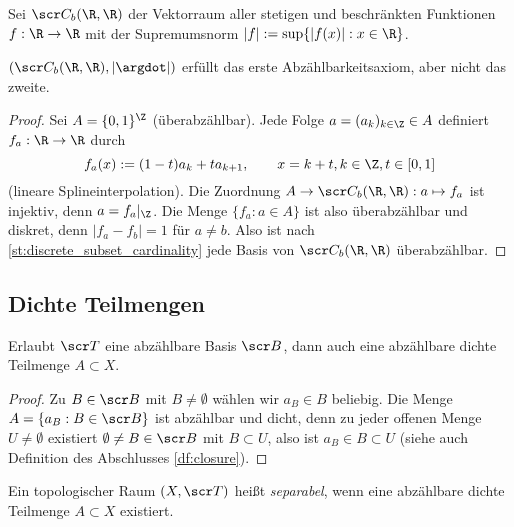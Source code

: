 \begin{st}
	Sei $\scr C_b(\R, \R)$ der Vektorraum aller stetigen und beschränkten Funktionen $f: \R \to \R$ mit der Supremumsnorm $|f| := \sup \{|f(x)| : x \in \R \}$.

	$(\scr C_b(\R,\R),|\argdot|)$ erfüllt das erste Abzählbarkeitsaxiom, aber nicht das zweite.
	\begin{proof}
		Sei $A = \{0, 1\}^\Z$ (überabzählbar).
		Jede Folge $a = (a_k)_{k\in\Z} \in A$ definiert $f_a : \R \to \R$ durch
		\[
			f_a(x)
			:= (1-t)a_k + t a_{k+1},
			\qquad x = k+t, k \in \Z, t \in [0,1]
		\]
		(lineare Splineinterpolation).
		Die Zuordnung $A \to \scr C_b (\R, \R) : a \mapsto f_a$ ist injektiv, denn $a = f_a|_\Z$.
		Die Menge $\{f_a : a \in A\}$ ist also überabzählbar und diskret, denn $|f_a - f_b| = 1$ für $a\neq b$.
		Also ist nach \ref{st:discrete_subset_cardinality} jede Basis von $\scr C_b (\R, \R)$ überabzählbar.
	\end{proof}
\end{st}

\subsection{Dichte Teilmengen}

\begin{st} \label{st:countable_base_countable_dense_subset}
	Erlaubt $\scr T$ eine abzählbare Basis $\scr B$, dann auch eine abzählbare dichte Teilmenge $A \subset X$.
	\begin{proof}
		Zu $B \in \scr B$ mit $B \neq \emptyset$ wählen wir $a_B \in B$ beliebig.
		Die Menge $A = \{a_B : B \in \scr B\}$ ist abzählbar und dicht, denn zu jeder offenen Menge $U \neq \emptyset$ existiert $\emptyset \neq B \in \scr B$ mit $B \subset U$, also ist $a_B \in B \subset U$ (siehe auch Definition des Abschlusses \ref{df:closure}).
	\end{proof}
\end{st}

\begin{df}
	Ein topologischer Raum $(X, \scr T)$ heißt \emph{separabel}, wenn eine abzählbare dichte Teilmenge $A \subset X$ existiert.
\end{df}

